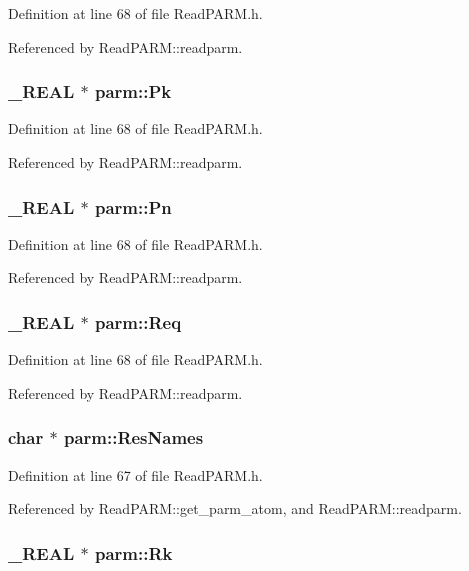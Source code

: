 Definition at line 68 of file Read\-PARM.h.

Referenced by Read\-PARM::readparm.
\subsubsection{\setlength{\rightskip}{0pt plus 5cm}\_\-REAL $\ast$ parm::Pk}\label{structparm_m42}




Definition at line 68 of file Read\-PARM.h.

Referenced by Read\-PARM::readparm.
\subsubsection{\setlength{\rightskip}{0pt plus 5cm}\_\-REAL $\ast$ parm::Pn}\label{structparm_m43}




Definition at line 68 of file Read\-PARM.h.

Referenced by Read\-PARM::readparm.
\subsubsection{\setlength{\rightskip}{0pt plus 5cm}\_\-REAL $\ast$ parm::Req}\label{structparm_m39}




Definition at line 68 of file Read\-PARM.h.

Referenced by Read\-PARM::readparm.
\subsubsection{\setlength{\rightskip}{0pt plus 5cm}char $\ast$ parm::Res\-Names}\label{structparm_m33}




Definition at line 67 of file Read\-PARM.h.

Referenced by Read\-PARM::get\_\-parm\_\-atom, and Read\-PARM::readparm.
\subsubsection{\setlength{\rightskip}{0pt plus 5cm}\_\-REAL $\ast$ parm::Rk}\label{structparm_m38}




